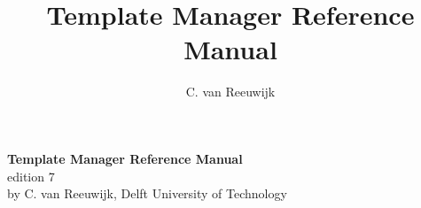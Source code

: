 \title{Template Manager Reference Manual}
\author{C. van Reeuwijk}
\maketitle
\begin{titlepage}
\begin{center}
{\Huge \bf Template Manager Reference Manual} \\
\vspace{2mm}
{\Large edition 7} \\
\vspace{5mm}
{\Large by C. van Reeuwijk, Delft University of Technology}
\vspace{2cm}
\begin{center}

\end{center}
\end{center}
\newpage
\end{titlepage}

